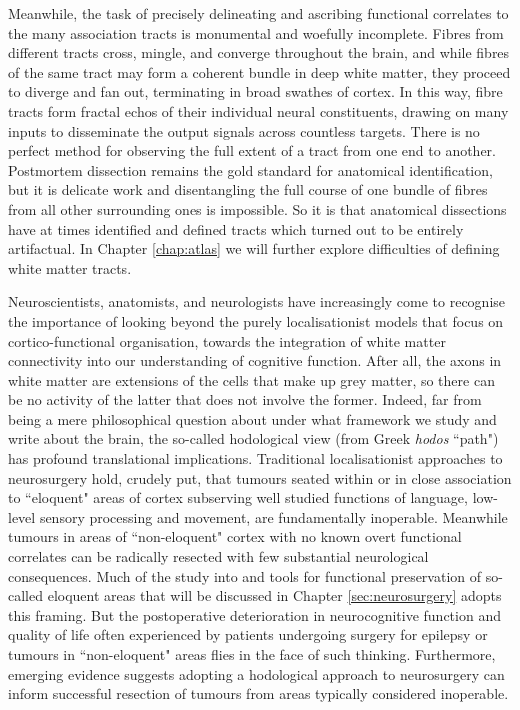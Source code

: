 Meanwhile, the task of precisely delineating and ascribing functional correlates to the many association tracts is monumental and woefully incomplete.
Fibres from different tracts cross, mingle, and converge throughout the brain, and while fibres of the same tract may form a coherent bundle in deep white matter, they proceed to diverge and fan out, terminating in broad swathes of cortex.
In this way, fibre tracts form fractal echos of their individual neural constituents, drawing on many inputs to disseminate the output signals across countless targets.
There is no perfect method for observing the full extent of a tract from one end to another.
Postmortem dissection remains the gold standard for anatomical identification, but it is delicate work and disentangling the full course of one bundle of fibres from all other surrounding ones is impossible.
So it is that anatomical dissections have at times identified and defined tracts which turned out to be entirely artifactual.
In Chapter \ref{chap:atlas} we will further explore difficulties of defining white matter tracts.

Neuroscientists, anatomists, and neurologists have increasingly come to recognise the importance of looking beyond the purely localisationist models that focus on cortico-functional organisation, towards the integration of white matter connectivity into our understanding of cognitive function.\autocite{ffytche2005,Catani2007}
After all, the axons in white matter are extensions of the cells that make up grey matter, so there can be no activity of the latter that does not involve the former.
Indeed, far from being a mere philosophical question about under what framework we study and write about the brain, the so-called hodological view (from Greek \textit{hodos} ``path") has profound translational implications.
Traditional localisationist approaches to neurosurgery hold, crudely put, that tumours seated within or in close association to ``eloquent" areas of cortex subserving well studied functions of language, low-level sensory processing and movement, are fundamentally inoperable.
Meanwhile tumours in areas of ``non-eloquent" cortex with no known overt functional correlates can be radically resected with few substantial neurological consequences.
Much of the study into and tools for functional preservation of so-called eloquent areas that will be discussed in Chapter \ref{sec:neurosurgery} adopts this framing.
But the postoperative deterioration in neurocognitive function and quality of life often experienced by patients undergoing surgery for epilepsy or tumours in ``non-eloquent" areas flies in the face of such thinking.
\autocite{Satoer2017,Mandonnet2017a,Rijnen2019,Herbet2019,Vigren2020a,Dadario2021}
Furthermore, emerging evidence suggests adopting a hodological approach to neurosurgery can inform successful resection of tumours from areas typically considered inoperable\autocite{Dadario2021,DeBenedictis2011b,Suzuki2023}.

